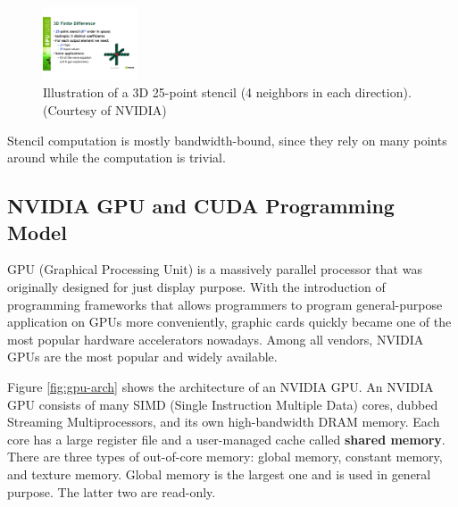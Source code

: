 
\begin{figure}[!t]
\centering
\includegraphics[width=0.25\textwidth]{./images/25-point-stencil.pdf}
\caption{Illustration of a 3D 25-point stencil (4 neighbors in each direction). (Courtesy of NVIDIA)}
\label{fig:25-point_stencil}
\end{figure}

Stencil computation is mostly bandwidth-bound, since they rely on many points around while the computation is trivial.

\subsection{NVIDIA GPU and CUDA Programming Model}
GPU (Graphical Processing Unit) is a massively parallel processor that was originally designed for just display purpose. With the introduction of programming frameworks that allows programmers to program general-purpose application on GPUs more conveniently, graphic cards quickly became one of the most popular hardware accelerators nowadays. Among all vendors, NVIDIA GPUs are the most popular and widely available.

Figure \ref{fig:gpu-arch} shows the architecture of an NVIDIA GPU. An NVIDIA GPU consists of many SIMD (Single Instruction Multiple Data) cores, dubbed Streaming Multiprocessors, and its own high-bandwidth DRAM memory. Each core has a large register file and a user-managed cache called \textbf{shared memory}. There are three types of out-of-core memory: global memory, constant memory, and texture memory. Global memory is the largest one and is used in general purpose. The latter two are read-only.

